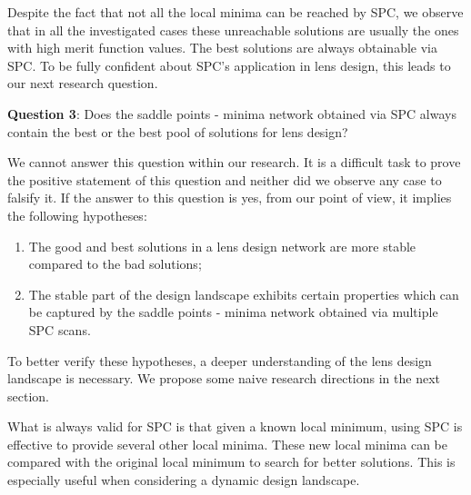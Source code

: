 Despite the fact that not all the local minima can be reached by SPC, we observe that in all the investigated cases these unreachable solutions are usually the ones with high merit function values. The best solutions are always obtainable via SPC. To be fully confident about SPC's application in lens design, this leads to our next research question.

\vspace{1em}

\textbf{Question 3}: Does the saddle points - minima network obtained via SPC always contain the best or the best pool of solutions for lens design? 

We cannot answer this question within our research. It is a difficult task to prove the positive statement of this question and neither did we observe any case to falsify it. If the answer to this question is yes, from our point of view, it implies the following hypotheses:

\begin{enumerate}[nosep]
\item The good and best solutions in a lens design network are more stable compared to the bad solutions;
\item The stable part of the design landscape exhibits certain properties which can be captured by the saddle points - minima network obtained via multiple SPC scans.
\end{enumerate}


To better verify these hypotheses, a deeper understanding of the lens design landscape is necessary. We propose some naive research directions in the next section. 

\vspace{1em}

What is always valid for SPC is that given a known local minimum, using SPC is effective to provide several other local minima. These new local minima can be compared with the original local minimum to search for better solutions. This is especially useful when considering a dynamic design landscape. 

